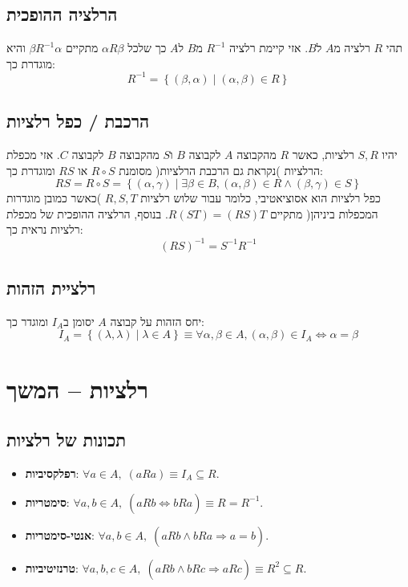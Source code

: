 \documentclass[11pt, oneside]{article}
\newcommand{\opr}[1]{\underset{\text{#1}}{\Rightarrow}}
\newcommand{\bidiarrow}[1]{\underset{\text{#1}}{\Leftrightarrow}}
\newcommand{\inv}[1]{#1^{-1}}
\newcommand{\definition}[2]{\textbf{#1}: #2.}
\begin{document}
\subsection*{הרלציה ההופכית}
תהי $R$ רלציה מ$A$ ל$B$. אזי קיימת רלציה $\inv{R}$ מ$B$ ל$A$ כך שלכל $\alpha R \beta$ מתקיים $\beta \inv{R} \alpha$ והיא מוגדרת כך:
\[
\inv{R} = \left\{(\beta, \alpha) \mid (\alpha, \beta) \in R\right\}
\]

\subsection*{הרכבת / כפל רלציות}
יהיו $S, R$ רלציות, כאשר $R$ מהקבוצה $A$ לקבוצה $B$ ו$S$ מהקבוצה $B$ לקבוצה $C$. אזי מכפלת הרלציות )נקראת גם הרכבת הרלציות( מסומנת $R \circ S$ או $RS$ ומוגדרת כך:
\[
RS = R \circ S = \left\{(\alpha, \gamma) \mid \exists \beta \in B, (\alpha, \beta) \in R \land (\beta, \gamma) \in S\right\}
\]
כפל רלציות הוא אסוציאטיבי, כלומר עבור שלוש רלציות $R, S, T$ )כאשר כמובן מוגדרות המכפלות ביניהן( מתקיים $R(ST) = (RS)T$. בנוסף, הרלציה ההופכית של מכפלת רלציות נראית כך:
\[
\inv{(RS)} = \inv{S}\inv{R}
\]

\subsection*{רלציית הזהות}
יחס הזהות על קבוצה $A$ יסומן ב$I_{A}$ ומוגדר כך:
\[
I_{A} = \left\{(\lambda, \lambda) \mid \lambda \in A\right\} \equiv \forall \alpha, \beta \in A, (\alpha, \beta) \in I_{A} \iff \alpha = \beta
\]
\clearpage

\section*{רלציות -- המשך}

\subsection*{תכונות של רלציות}
\begin{itemize}
\item \definition{רפלקסיביות}{$\forall a \in A,\;(aRa) \equiv I_{A} \subseteq R$}
\item \definition{סימטריות}{$\forall a, b \in A,\;(aRb \bidiarrow{} bRa) \equiv R = \inv{R}$}
\item \definition{אנטי-סימטריות}{$\forall a, b \in A,\;(aRb \land bRa \opr{} a = b)$}
\item \definition{טרנזיטיביות}{$\forall a, b, c \in A,\;(aRb \land bRc \opr{} aRc) \equiv R^{2} \subseteq R$}
\end{itemize}
\end{document}
